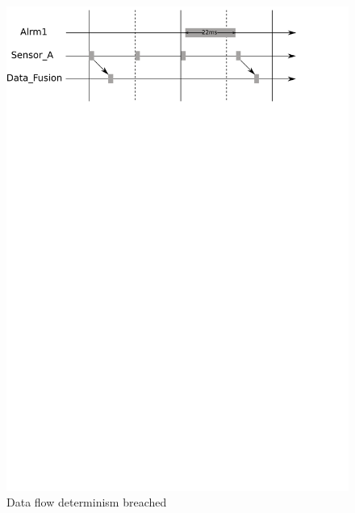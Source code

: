 \begin{figure}
\centering 
\includegraphics[scale=0.75]{figs/control_simple_breach}
\caption{Data flow determinism breached}
\label{fig:det_breach_simple}
\vspace{5mm}

\end{figure}
